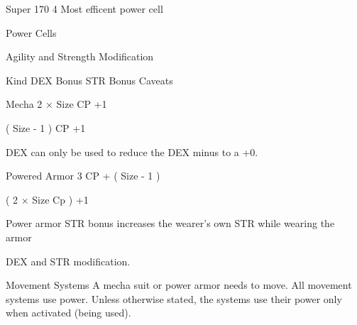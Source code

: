 \documentclass[twoside]{book}
\begin{document}
                      
                       Super   
                       170   
                       4   
                       Most efficent power cell   
                      
                    
                  Power Cells  
                  
                
                
                Agility and Strength Modification  
                  
                    
                      
                       Kind   
                       DEX Bonus   
                       STR Bonus   
                       Caveats   
                      
                      
                       Mecha   
                                   2
                            ×    Size CP  
                              +1    
                             
                        
                                 (   
                         Size    -    1    )
                            CP        +1
                               
                        
                         DEX can only be used to reduce the DEX
                         minus to a +0. 
                      
                      
                       Powered Armor   
                                   3
                            CP        +
                            (    Size    -
                            1    )    
                             
                        
                                   (
                            2    ×   
                         Size Cp    )      
                          +1         
                        
                         Power armor STR bonus increases the
                         wearer’s own STR while wearing the armor
                         
                      
                    
                  DEX and STR modification.  
                  
                
                
                Movement Systems  
                    A mecha suit or power armor needs to move. All
                   movement systems use power. Unless otherwise stated,
                   the systems use their power only when activated (being
                   used). 
                  
\end{document}

